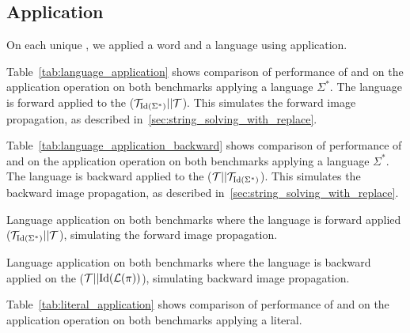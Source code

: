 \subsection{Application}

On each unique \nft, we applied a word and a language using \nft application.


Table~\ref{tab:language_application} shows comparison of performance of \mata and \mona on the application operation on both benchmarks applying a language $\Sigma^*$.
The language is forward applied to the \nft ($\mathcal{T}_{\text{Id}(\Sigma^*)} || \mathcal{T} $).
This simulates the forward image propagation, as described in~\ref{sec:string_solving_with_replace}.

Table~\ref{tab:language_application_backward} shows comparison of performance of \mata and \mona on the application operation on both benchmarks applying a language $\Sigma^*$.
The language is backward applied to the \nft ($\mathcal{T} || \mathcal{T}_{\text{Id}(\Sigma^*)}$).
This simulates the backward image propagation, as described in~\ref{sec:string_solving_with_replace}.

\begin{table}[ht]
  \centering
  
  \caption{
    Language application on both benchmarks where the language is forward applied ($\mathcal{T}_{\text{Id}(\Sigma^*)} || \mathcal{T}$), simulating the forward image propagation.
  }
  \label{tab:language_application}
\end{table}

\begin{table}[ht]
  \centering
  
  \caption{
    Language application on both benchmarks where the language is backward applied on the \nft ($\mathcal{T} || \text{Id}(\mathcal{L}(\pi))$), simulating backward image propagation.
  }
  \label{tab:language_application_backward}
\end{table}


Table~\ref{tab:literal_application} shows comparison of performance of \mata and \mona on the application operation on both benchmarks applying a literal.

